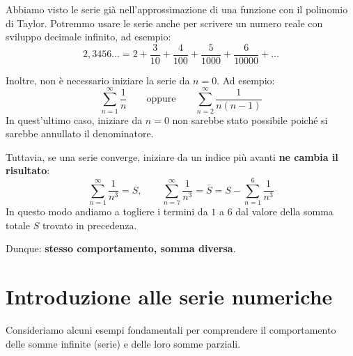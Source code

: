 \documentclass[12pt]{report}
\begin{document}
	\begin{osservazione}{}{}
		
		Abbiamo visto le serie già nell'approssimazione di una funzione con il polinomio di Taylor. Potremmo usare le serie anche per scrivere un numero reale con sviluppo decimale infinito, ad esempio:
		\[
		2{,}3456\dots = 2 + \frac{3}{10} + \frac{4}{100} + \frac{5}{1000} + \frac{6}{10000} + \dots
		\]
		
	\end{osservazione}
	
	Inoltre, non è necessario iniziare la serie da $n=0$. Ad esempio:
	\[
	\sum_{n=1}^{\infty} \frac{1}{n} \qquad \text{oppure} \qquad \sum_{n=2}^{\infty} \frac{1}{n(n-1)}
	\]
	In quest'ultimo caso, iniziare da $n=0$ non sarebbe stato possibile poiché si sarebbe annullato il denominatore.
	
	Tuttavia, se una serie converge, iniziare da un indice più avanti \textbf{ne cambia il risultato}:
	\[
	\sum_{n=1}^{\infty} \frac{1}{n^3} = S, \qquad \sum_{n=7}^{\infty} \frac{1}{n^3} = \bar{S} = S - \sum_{n=1}^{6} \frac{1}{n^3}
	\]
	In questo modo andiamo a togliere i termini da $1$ a $6$ dal valore della somma totale $S$ trovato in precedenza.
	
	Dunque: \textbf{stesso comportamento, somma diversa}.
	
	\section{Introduzione alle serie numeriche}
	
	Consideriamo alcuni esempi fondamentali per comprendere il comportamento delle somme infinite (serie) e delle loro somme parziali.
	
\end{document}
